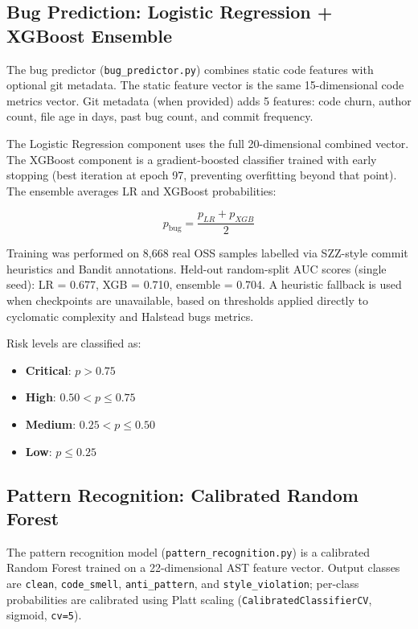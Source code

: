 \documentclass[12pt, oneside]{report}
\begin{document}
\subsection{Bug Prediction: Logistic Regression + XGBoost Ensemble}
\label{ssec:bugs}

The bug predictor (\texttt{bug\_predictor.py}) combines static code features with optional
git metadata. The static feature vector is the same 15-dimensional code metrics vector.
Git metadata (when provided) adds 5 features: code churn, author count, file age in days,
past bug count, and commit frequency.

The Logistic Regression component uses the full 20-dimensional combined vector. The XGBoost
component is a gradient-boosted classifier trained with early stopping (best iteration at
epoch 97, preventing overfitting beyond that point). The ensemble averages LR and XGBoost
probabilities:

\begin{equation}
  p_{\text{bug}} = \frac{p_{LR} + p_{XGB}}{2}
\end{equation}

Training was performed on 8,668 real OSS samples labelled via SZZ-style commit heuristics
and Bandit annotations. Held-out random-split AUC scores (single seed): LR = 0.677, XGB = 0.710, ensemble = 0.704.
A heuristic fallback is used when checkpoints are unavailable, based on thresholds applied
directly to cyclomatic complexity and Halstead bugs metrics.

Risk levels are classified as:
\begin{itemize}
  \item \textbf{Critical}: $p > 0.75$
  \item \textbf{High}: $0.50 < p \leq 0.75$
  \item \textbf{Medium}: $0.25 < p \leq 0.50$
  \item \textbf{Low}: $p \leq 0.25$
\end{itemize}

\subsection{Pattern Recognition: Calibrated Random Forest}
\label{ssec:pattern}

The pattern recognition model (\texttt{pattern\_recognition.py}) is a calibrated Random Forest trained on a 22-dimensional AST feature vector. Output classes are \texttt{clean}, \texttt{code\_smell}, \texttt{anti\_pattern}, and \texttt{style\_violation}; per-class probabilities are calibrated using Platt scaling (\texttt{CalibratedClassifierCV}, sigmoid, \texttt{cv=5}).
\end{document}
